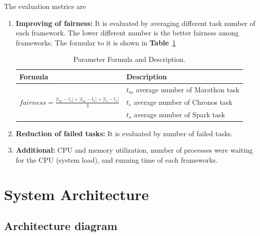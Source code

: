 \documentclass[12pt,oneside,openright,a4paper]{cpe-english-project}
\begin{document}
\hspace{10mm}The evaluation metrics are 

\begin{enumerate}
  \item \textbf{Improving of fairness:} It is evaluated by averaging different task number of each framework. The lower different number is the better fairness among frameworks. The formular to it is shown in \textbf{Table}~\ref{tbl:formular}
  
    \begin{table}[!h]
    \caption{Parameter Formula and Description.}\label{tbl:formular}
    \begin{tabular}{@{}|p{}|p{}|}
      \hline
      \textbf{Formula} & \textbf{Description} \\ 
      \hline
      \multirow{3}{*}{$fairness = \frac{|t_m-t_c|+|t_m-t_s|+|t_c-t_s|}{3} $} & $t_m$ average number of Marathon task\\ 
      & $t_c$ average number of Chronos task\\ 
      & $t_s$ average number of Spark task\\ 
      \hline
    \end{tabular}
  \end{table}
  
  \item \textbf{Reduction of failed tasks:} It is evaluated by number of failed tasks.
  \item \textbf{Additional:} CPU and memory utilization, number of processes were waiting for the CPU (system load), and running time of each frameworks.
\end{enumerate}

\newpage
\section{System Architecture}

\subsection{Architecture diagram}  
\end{document}
